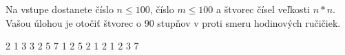 




Na vstupe dostanete číslo $n \leq 100$, číslo $m \leq 100$ a štvorec čísel veľkosti $n*n$. Vašou úlohou je otočiť štvorec o 90 stupňov v proti smeru hodinových ručičiek.

2 1 3 
3 2 5 
7 1 2 
 5 2 
1 2 1 
2 3 7 
\koniec


